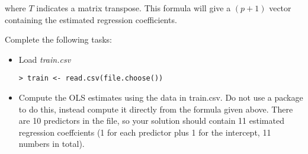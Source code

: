 \documentclass[fontsize=10pt,DIV=14]{scrartcl}
\begin{document}
\begin{enumerate}
		where $T$ indicates a matrix transpose. This formula will give a $(p + 1)$ vector containing the estimated regression coeﬃcients.

		Complete the following tasks:
		\begin{itemize}
			\item
			Load \emph{train.csv}

\begin{verbatim}
> train <- read.csv(file.choose())
\end{verbatim}
			
			\item
			Compute the OLS estimates using the data in train.csv. Do not use a package to do this, instead compute it directly from the formula given above. There are 10 predictors in the ﬁle, so your solution should contain 11 estimated regression coeffcients (1 for each predictor plus 1 for the intercept, 11 numbers in total).


\end{itemize}
\end{enumerate}
\end{document}
